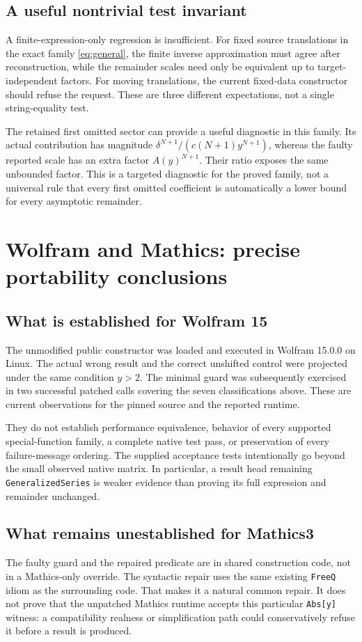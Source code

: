 \documentclass[11pt,letterpaper]{article}
\newcommand{\code}[1]{\texttt{#1}}
\begin{document}
\subsection{A useful nontrivial test invariant}
A finite-expression-only regression is insufficient. For fixed source translations in the exact family \eqref{eq:general}, the finite inverse approximation must agree after reconstruction, while the remainder scales need only be equivalent up to target-independent factors. For moving translations, the current fixed-data constructor should refuse the request. These are three different expectations, not a single string-equality test.

The retained first omitted sector can provide a useful diagnostic in this family. Its actual contribution has magnitude $\delta^{N+1}/(c(N+1)y^{N+1})$, whereas the faulty reported scale has an extra factor $A(y)^{N+1}$. Their ratio exposes the same unbounded factor. This is a targeted diagnostic for the proved family, not a universal rule that every first omitted coefficient is automatically a lower bound for every asymptotic remainder.

\section{Wolfram and Mathics: precise portability conclusions}
\subsection{What is established for Wolfram 15}
The unmodified public constructor was loaded and executed in Wolfram 15.0.0 on Linux. The actual wrong result and the correct unshifted control were projected under the same condition $y>2$. The minimal guard was subsequently exercised in two successful patched calls covering the seven classifications above. These are current observations for the pinned source and the reported runtime.

They do not establish performance equivalence, behavior of every supported special-function family, a complete native test pass, or preservation of every failure-message ordering. The supplied acceptance tests intentionally go beyond the small observed native matrix. In particular, a result head remaining \code{GeneralizedSeries} is weaker evidence than proving its full expression and remainder unchanged.

\subsection{What remains unestablished for Mathics3}
The faulty guard and the repaired predicate are in shared construction code, not in a Mathics-only override. The syntactic repair uses the same existing \code{FreeQ} idiom as the surrounding code. That makes it a natural common repair. It does not prove that the unpatched Mathics runtime accepts this particular \code{Abs[y]} witness: a compatibility realness or simplification path could conservatively refuse it before a result is produced.
\end{document}
